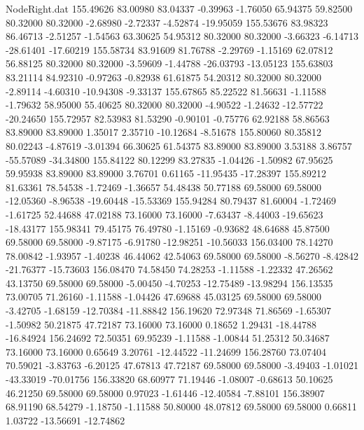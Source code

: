 \begin{filecontents}{NodeRight.dat}
 155.49626   83.00980   83.04337    -0.39963   -1.76050   65.94375   59.82500   80.32000   80.32000   -2.68980   -2.72337   -4.52874  -19.95059
 155.53676   83.98323   86.46713    -2.51257   -1.54563   63.30625   54.95312   80.32000   80.32000   -3.66323   -6.14713  -28.61401  -17.60219
 155.58734   83.91609   81.76788    -2.29769   -1.15169   62.07812   56.88125   80.32000   80.32000   -3.59609   -1.44788  -26.03793  -13.05123
 155.63803   83.21114   84.92310    -0.97263   -0.82938   61.61875   54.20312   80.32000   80.32000   -2.89114   -4.60310  -10.94308   -9.33137
 155.67865   85.22522   81.56631    -1.11588   -1.79632   58.95000   55.40625   80.32000   80.32000   -4.90522   -1.24632  -12.57722  -20.24650
 155.72957   82.53983   81.53290    -0.90101   -0.75776   62.92188   58.86563   83.89000   83.89000    1.35017    2.35710  -10.12684   -8.51678
 155.80060   80.35812   80.02243    -4.87619   -3.01394   66.30625   61.54375   83.89000   83.89000    3.53188    3.86757  -55.57089  -34.34800
 155.84122   80.12299   83.27835    -1.04426   -1.50982   67.95625   59.95938   83.89000   83.89000    3.76701    0.61165  -11.95435  -17.28397
 155.89212   81.63361   78.54538    -1.72469   -1.36657   54.48438   50.77188   69.58000   69.58000  -12.05360   -8.96538  -19.60448  -15.53369
 155.94284   80.79437   81.60004    -1.72469   -1.61725   52.44688   47.02188   73.16000   73.16000   -7.63437   -8.44003  -19.65623  -18.43177
 155.98341   79.45175   76.49780    -1.15169   -0.93682   48.64688   45.87500   69.58000   69.58000   -9.87175   -6.91780  -12.98251  -10.56033
 156.03400   78.14270   78.00842    -1.93957   -1.40238   46.44062   42.54063   69.58000   69.58000   -8.56270   -8.42842  -21.76377  -15.73603
 156.08470   74.58450   74.28253    -1.11588   -1.22332   47.26562   43.13750   69.58000   69.58000   -5.00450   -4.70253  -12.75489  -13.98294
 156.13535   73.00705   71.26160    -1.11588   -1.04426   47.69688   45.03125   69.58000   69.58000   -3.42705   -1.68159  -12.70384  -11.88842
 156.19620   72.97348   71.86569    -1.65307   -1.50982   50.21875   47.72187   73.16000   73.16000    0.18652    1.29431  -18.44788  -16.84924
 156.24692   72.50351   69.95239    -1.11588   -1.00844   51.25312   50.34687   73.16000   73.16000    0.65649    3.20761  -12.44522  -11.24699
 156.28760   73.07404   70.59021    -3.83763   -6.20125   47.67813   47.72187   69.58000   69.58000   -3.49403   -1.01021  -43.33019  -70.01756
 156.33820   68.60977   71.19446    -1.08007   -0.68613   50.10625   46.21250   69.58000   69.58000    0.97023   -1.61446  -12.40584   -7.88101
 156.38907   68.91190   68.54279    -1.18750   -1.11588   50.80000   48.07812   69.58000   69.58000    0.66811    1.03722  -13.56691  -12.74862

\end{filecontents}
